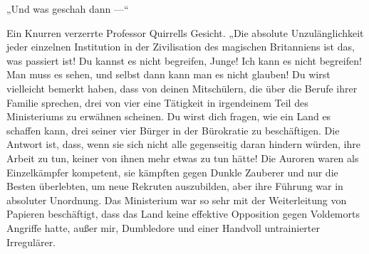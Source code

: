 „Und was geschah dann —“

Ein Knurren verzerrte Professor Quirrells Gesicht.
„Die absolute Unzulänglichkeit jeder einzelnen Institution in der Zivilisation des magischen Britanniens ist das, was passiert ist! Du kannst es nicht begreifen, Junge! Ich kann es nicht begreifen! Man muss es sehen, und selbst dann kann man es nicht glauben! Du wirst vielleicht bemerkt haben, dass von deinen Mitschülern, die über die Berufe ihrer Familie sprechen, drei von vier eine Tätigkeit in irgendeinem Teil des Ministeriums zu erwähnen scheinen. Du wirst dich fragen, wie ein Land es schaffen kann, drei seiner vier Bürger in der Bürokratie zu beschäftigen. Die Antwort ist, dass, wenn sie sich nicht alle gegenseitig daran hindern würden, ihre Arbeit zu tun, keiner von ihnen mehr etwas zu tun hätte! Die Auroren waren als Einzelkämpfer kompetent, sie kämpften gegen Dunkle Zauberer und nur die Besten überlebten, um neue Rekruten auszubilden, aber ihre Führung war in absoluter Unordnung. Das Ministerium war so sehr mit der Weiterleitung von Papieren beschäftigt, dass das Land keine effektive Opposition gegen Voldemorts Angriffe hatte, außer mir, Dumbledore und einer Handvoll untrainierter Irregulärer.
